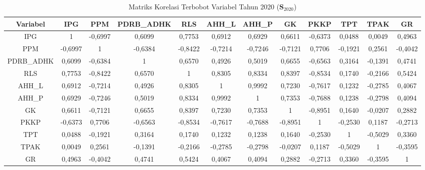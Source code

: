 \begin{table}[H]
\centering
\caption{Matriks Korelasi Terbobot Variabel Tahun 2020 ($\mathbf{S}_{2020}$)} \label{tab:app1matriks_intra_loading_2020}
\begin{adjustbox}{max width=\textwidth, max height=0.85\textheight}
\begin{tabular}{|c|c|c|c|c|c|c|c|c|c|c|c|}
\hline
\textbf{Variabel} & \textbf{IPG} & \textbf{PPM} & \textbf{PDRB\_ADHK} & \textbf{RLS} & \textbf{AHH\_L} & \textbf{AHH\_P} & \textbf{GK} & \textbf{PKKP} & \textbf{TPT} & \textbf{TPAK} & \textbf{GR} \\
\hline
IPG & 1 & -0,6997 & 0,6099 & 0,7753 & 0,6912 & 0,6929 & 0,6611 & -0,6373 & 0,0488 & 0,0049 & 0,4963 \\
PPM & -0,6997 & 1 & -0,6384 & -0,8422 & -0,7214 & -0,7246 & -0,7121 & 0,7706 & -0,1921 & 0,2561 & -0,4042 \\
PDRB\_ADHK & 0,6099 & -0,6384 & 1 & 0,6570 & 0,4926 & 0,5019 & 0,6655 & -0,6563 & 0,3164 & -0,1391 & 0,4741 \\
RLS & 0,7753 & -0,8422 & 0,6570 & 1 & 0,8305 & 0,8334 & 0,8397 & -0,8534 & 0,1740 & -0,2166 & 0,5424 \\
AHH\_L & 0,6912 & -0,7214 & 0,4926 & 0,8305 & 1 & 0,9992 & 0,7230 & -0,7617 & 0,1232 & -0,2785 & 0,4067 \\
AHH\_P & 0,6929 & -0,7246 & 0,5019 & 0,8334 & 0,9992 & 1 & 0,7353 & -0,7688 & 0,1238 & -0,2798 & 0,4094 \\
GK & 0,6611 & -0,7121 & 0,6655 & 0,8397 & 0,7230 & 0,7353 & 1 & -0,8951 & 0,1640 & -0,0207 & 0,2882 \\
PKKP & -0,6373 & 0,7706 & -0,6563 & -0,8534 & -0,7617 & -0,7688 & -0,8951 & 1 & -0,2530 & 0,1187 & -0,2713 \\
TPT & 0,0488 & -0,1921 & 0,3164 & 0,1740 & 0,1232 & 0,1238 & 0,1640 & -0,2530 & 1 & -0,5029 & 0,3360 \\
TPAK & 0,0049 & 0,2561 & -0,1391 & -0,2166 & -0,2785 & -0,2798 & -0,0207 & 0,1187 & -0,5029 & 1 & -0,3595 \\
GR & 0,4963 & -0,4042 & 0,4741 & 0,5424 & 0,4067 & 0,4094 & 0,2882 & -0,2713 & 0,3360 & -0,3595 & 1 \\
\hline
\end{tabular}
\end{adjustbox}
\end{table}
